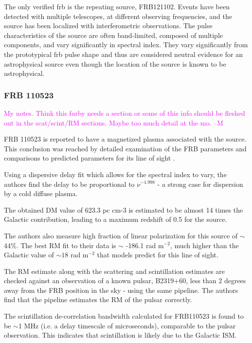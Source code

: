 \documentclass[a4paper,fleqn,usenatbib]{mnras}
\newcommand{\cM}[1]{\textcolor{magenta}{ #1 --M}}
\begin{document}
The only verified \gls{frb} is the repeating source, FRB121102. Events have been
detected with multiple telescopes, at different observing frequencies, and the
source has been localized with interferometric observations. The pulse
characteristics of the source are often band-limited, composed of multiple
components, and vary significantly in spectral index. They vary significantly
from the prototypical \gls{frb} pulse shape and thus are considered neutral
evidence for an astrophysical source even though the location of the source is
known to be astrophysical. 

\subsubsection{FRB 110523}
\cM{My notes. Think this furby needs a section or some of this info should be fleshed out in the scat/scint/RM sections. Maybe too much detail at the mo.}

FRB 110523 is reported to have a magnetized plasma associated with the source. This conclusion was reached by detailed examination of the FRB parameters and comparisons to predicted parameters for its line of sight \cite{}.

Using a dispersive delay fit which allows for the spectral index to vary, the authors find the delay to be proportional to $\nu^{-1.998}$  - a strong case for dispersion by a cold diffuse plasma. 

The obtained DM value of 623.3 pc cm-3 is estimated to be almost 14 times the Galactic contribution, leading to a maximum redshift of 0.5 for the source.

The authors also measure high fraction of linear polarization for this source of $\sim$ 44\%. The best RM fit to their data is $\sim$ -186.1 rad m$^{-2}$, much higher than the Galactic value of $\sim 18$ rad m$^{-2}$ that models predict for this line of sight.

The RM estimate along with the scattering and scintillation estimates are checked against an observation of a known pulsar, B2319+60, less than 2 degrees away from the FRB position in the sky - using the same pipeline. The authors find that the pipeline estimates the RM of the pulsar correctly.

The scintillation de-correlation bandwidth calculated for FRB110523 is found to be $\sim$1 MHz (i.e. a delay timescale of microseconds), comparable to the pulsar observation. This indicates that scintillation is likely due to the Galactic ISM.  
\end{document}
